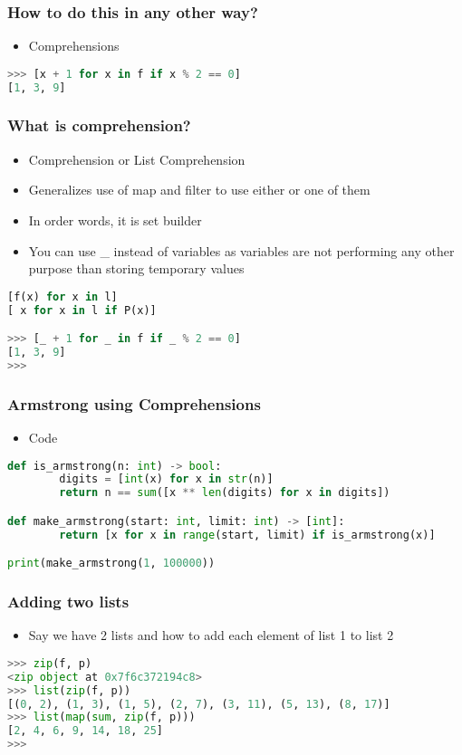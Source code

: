 \documentclass[14pt]{beamer}
\begin{document}
    \begin{frame}[containsverbatim]
        \frametitle{How to do this in any other way?}
		\begin{itemize}
		\item \alert {Comprehensions}
		\end{itemize}
        \begin{lstlisting}[language=Python]
>>> [x + 1 for x in f if x % 2 == 0]
[1, 3, 9]
        \end{lstlisting}
    \end{frame}

    \begin{frame}[containsverbatim]
        \frametitle{What is comprehension?}
		\begin{itemize}
		\item Comprehension or List Comprehension
		\item Generalizes use of map and filter to use either or one of them
		\item In order words, it is set builder
		\item You can use \_ instead of variables as variables are not performing any other purpose than storing temporary values
		\end{itemize}
        \begin{lstlisting}[language=Python]
[f(x) for x in l]
[ x for x in l if P(x)]

>>> [_ + 1 for _ in f if _ % 2 == 0]
[1, 3, 9]
>>> 
        \end{lstlisting}
    \end{frame}

    \begin{frame}[containsverbatim]
        \frametitle{Armstrong using Comprehensions}
		\begin{itemize}
		\item Code
		\end{itemize}
        \begin{lstlisting}[language=Python]
def is_armstrong(n: int) -> bool:
        digits = [int(x) for x in str(n)]
        return n == sum([x ** len(digits) for x in digits])

def make_armstrong(start: int, limit: int) -> [int]:
        return [x for x in range(start, limit) if is_armstrong(x)]

print(make_armstrong(1, 100000))
        \end{lstlisting}
    \end{frame}

    \begin{frame}[containsverbatim]
        \frametitle{Adding two lists}
		\begin{itemize}
		\item Say we have 2 lists and how to add each element of list 1 to list 2
		\end{itemize}
        \begin{lstlisting}[language=Python]
>>> zip(f, p)
<zip object at 0x7f6c372194c8>
>>> list(zip(f, p))
[(0, 2), (1, 3), (1, 5), (2, 7), (3, 11), (5, 13), (8, 17)]
>>> list(map(sum, zip(f, p)))
[2, 4, 6, 9, 14, 18, 25]
>>> 
        \end{lstlisting}
    \end{frame}
\end{document}
